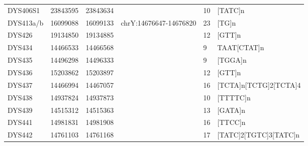 \begin{tabularx}{\linewidth}{l l l l l l }
DYS406S1    & 23843595 & 23843634 &                        & 10 & {[}TATC{]}n                                                                                                                          \\
DYS413a/b   & 16099088 & 16099133 & chrY:14676647-14676820 & 23 & {[}TG{]}n                                                                                                                            \\
DYS426      & 19134850 & 19134885 &                        & 12 & {[}GTT{]}n                                                                                                                           \\
DYS434      & 14466533 & 14466568 &                        & 9  & TAAT{[}CTAT{]}n                                                                                                                      \\
DYS435      & 14496298 & 14496333 &                        & 9  & {[}TGGA{]}n                                                                                                                          \\
DYS436      & 15203862 & 15203897 &                        & 12 & {[}GTT{]}n                                                                                                                           \\
DYS437      & 14466994 & 14467057 &                        & 16 & {[}TCTA{]}n{[}TCTG{]}2{[}TCTA{]}4                                                                                                    \\
DYS438      & 14937824 & 14937873 &                        & 10 & {[}TTTTC{]}n                                                                                                                         \\
DYS439      & 14515312 & 14515363 &                        & 13 & {[}GATA{]}n                                                                                                                          \\
DYS441      & 14981831 & 14981908 &                        & 16 & {[}TTCC{]}n                                                                                                                          \\
DYS442      & 14761103 & 14761168 &                        & 17 & {[}TATC{]}2{[}TGTC{]}3{[}TATC{]}n                                                                                                    \\

\end{tabularx}
